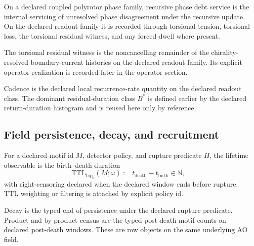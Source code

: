 \begin{definition}
\label{def:recursive-phase-debt-service}
On a declared coupled polyrotor phase family, recursive phase debt service is the internal servicing of unresolved phase disagreement under the recursive update. On the declared readout family it is recorded through torsional tension, torsional loss, the torsional residual witness, and any forced dwell where present.
\end{definition}

\begin{definition}
\label{def:torsional-residual-witness}
The torsional residual witness is the noncancelling remainder of the chirality-resolved boundary-current histories on the declared readout family. Its explicit operator realization is recorded later in the operator section.
\end{definition}

\begin{definition}[Cadence]
\label{def:cadence-bstar}
Cadence is the declared local recurrence-rate quantity on the declared readout class. The dominant residual-duration class $B^*$ is defined earlier by the declared return-duration histogram and is reused here only by reference.
\end{definition}


\subsection{Field persistence, decay, and recruitment}
\begin{definition}
\label{def:ttl-hazard}
For a declared motif id $M$, detector policy, and rupture predicate $H$, the lifetime observable is the birth--death duration
\[
\mathrm{TTL}_{\mathrm{bip}_0}(M;\omega):=t_{\mathrm{death}}-t_{\mathrm{birth}}\in\mathbb N,
\]
with right-censoring declared when the declared window ends before rupture. TTL weighting or filtering is attached by explicit policy id.
\end{definition}

\begin{definition}
\label{def:decay-census}
Decay is the typed end of persistence under the declared rupture predicate. Product and by-product census are the typed post-death motif counts on declared post-death windows. These are row objects on the same underlying AO field.
\end{definition}

